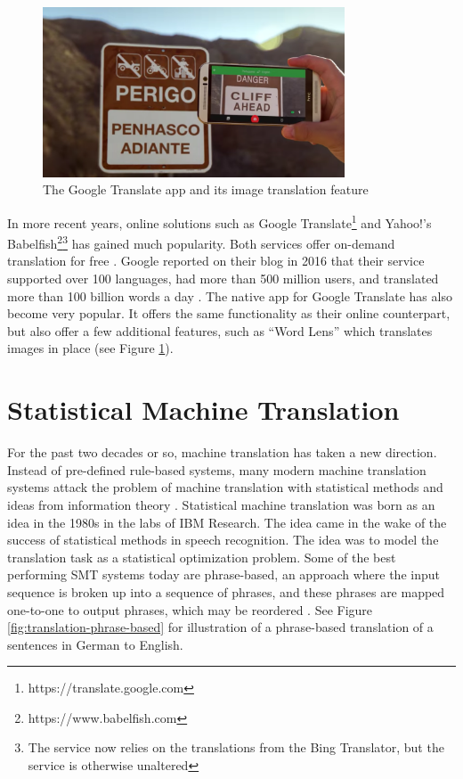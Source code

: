 \begin{figure}[H]
    \centering
    \includegraphics[width=0.8\textwidth]{fig/background_theory/google_translate_rt.png}
    \caption{The Google Translate app and its image translation feature}
    \label{fig:google-translate-rt}
\end{figure}

In more recent years, online solutions such as Google Translate\footnote{https://translate.google.com} and Yahoo!'s Babelfish\footnote{https://www.babelfish.com}\footnote{The service now relies on the translations from the Bing Translator, but the service is otherwise unaltered} has gained much popularity. Both services offer on-demand translation for free \citep{schuster2016googletranslate, hutchins2007machine}. Google reported on their blog in 2016 that their service supported over 100 languages, had more than 500 million users, and translated more than 100 billion words a day \citep{turovsky2016googletranslate}. The native app for Google Translate has also become very popular. It offers the same functionality as their online counterpart, but also offer a few additional features, such as ``Word Lens'' which translates images in place (see Figure \ref{fig:google-translate-rt}).


\section{Statistical Machine Translation}
For the past two decades or so, machine translation has taken a new direction. Instead of pre-defined rule-based systems, many modern machine translation systems attack the problem of machine translation with statistical methods and ideas from information theory \citep{brown1990statistical}. Statistical machine translation was born as an idea in the 1980s in the labs of IBM Research. The idea came in the wake of the success of statistical methods in speech recognition. The idea was to model the translation task as a statistical optimization problem. Some of the best performing SMT systems today are phrase-based, an approach where the input sequence is broken up into a sequence of phrases, and these phrases are mapped one-to-one to output phrases, which may be reordered \citep{koehn2010statistical}. See Figure \ref{fig:translation-phrase-based} for illustration of a phrase-based translation of a sentences in German to English.

